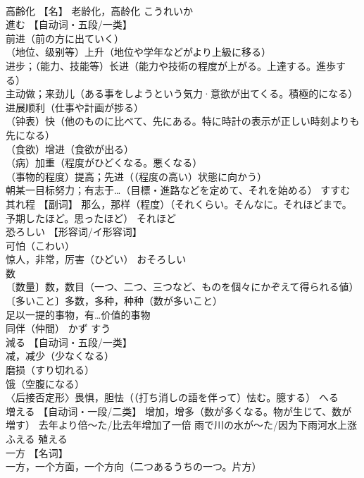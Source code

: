 \documentclass[8pt]{extreport}
\begin{document}
\begin{CJK}{UTF8}{min}
\\	高齢化	【名】 老龄化，高龄化	こうれいか	
\\	進む	【自动词・五段/一类】 
\\	前进（前の方に出ていく） 
\\	（地位、级别等）上升（地位や学年などがより上級に移る） 
\\	进步；（能力、技能等）长进（能力や技術の程度が上がる。上達する。進歩する） 
\\	主动做；来劲儿（ある事をしようという気力·意欲が出てくる。積極的になる） 
\\	进展顺利（仕事や計画が捗る） 
\\	（钟表）快（他のものに比べて、先にある。特に時計の表示が正しい時刻よりも先になる） 
\\	（食欲）增进（食欲が出る） 
\\	（病）加重（程度がひどくなる。悪くなる） 
\\	（事物的程度）提高；先进（（程度の高い）状態に向かう） 
\\	朝某一目标努力；有志于…（目標・進路などを定めて、それを始める）	すすむ	
\\	其れ程	【副词】 那么，那样（程度）（それくらい。そんなに。それほどまで。予期したほど。思ったほど）	それほど	
\\	恐ろしい	【形容词/イ形容词】 
\\	可怕（こわい） 
\\	惊人，非常，厉害（ひどい）	おそろしい	
\\	数	
\\	〔数量〕数，数目（一つ、二つ、三つなど、ものを個々にかぞえて得られる値） 
\\	〔多いこと〕多数，多种，种种（数が多いこと） 
\\	足以一提的事物，有…价值的事物 
\\	同伴（仲間）	かず すう	
\\	減る	【自动词・五段/一类】 
\\	减，减少（少なくなる） 
\\	磨损（すり切れる） 
\\	饿（空腹になる） 
\\	〈后接否定形〉畏惧，胆怯（（打ち消しの語を伴って）怯む。臆する）	へる	
\\	増える	【自动词・一段/二类】 增加，增多（数が多くなる。物が生じて、数が増す） 去年より倍〜た/比去年增加了一倍 雨で川の水が〜た/因为下雨河水上涨	ふえる	殖える
\\	一方	【名词】 
\\	一方，一个方面，一个方向（二つあるうちの一つ。片方） 

\end{CJK}
\end{document}
